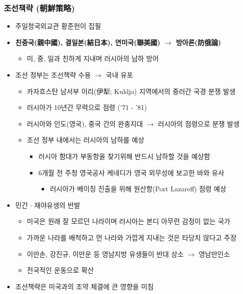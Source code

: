 \subsubsection*{조선책략 (朝鮮策略)}
\begin{itemize}
    \item 주일청국외교관 황준헌이 집필
    \item \textbf{친중국(親中國), 결일본(結日本), 연미국(聯美國) $\rightarrow$ 방아론(防俄論)}
    \begin{itemize}
        \item 미, 중, 일과 친하게 지내며 러시아의 남하 방어
    \end{itemize}
    \item 조선 정부는 조선책략 수용 $\rightarrow$ 국내 유포
    \begin{itemize}
        \item 카자흐스탄 남서부 이리(伊犁; Kuldja) 지역에서의 중러간 국경 분쟁 발생
        \item 러시아가 10년간 무력으로 점령 ('71 - '81)
        \item 러시아와 인도(영국), 중국 간의 완충지대 $\rightarrow$ 러시아의 점령으로 분쟁 발생
        \item 조선 정부 내에서는 러시아의 남하를 예상
        \begin{itemize}
            \item 러시아 함대가 부동항을 찾기위해 반드시 남하할 것을 예상함
            \item 6개월 전 주청 영국공사 케네디가 영국 외무성에 보고한 바와 유사
            \begin{itemize}
                \item 러시아가 베이징 진출을 위해 원산항(Port Lazareff) 점령 예상
            \end{itemize}
        \end{itemize}
    \end{itemize}
    \item 민간 $\cdot$ 재야유생의 반발
    \begin{itemize}
        \item 미국은 원래 잘 모르던 나라이며 러시아는 본디 아무런 감정이 없는 국가
        \item 가까운 나라를 배척하고 먼 나라와 가깝게 지내는 것은 타당치 않다고 주장
        \item 이만손, 강진규, 이만운 등 영남지방 유생들이 반대 상소 $\rightarrow$ 영남만인소
        \item 전국적인 운동으로 확산
    \end{itemize}
    \item 조선책략은 미국과의 조약 체결에 큰 영향을 미침
\end{itemize}

